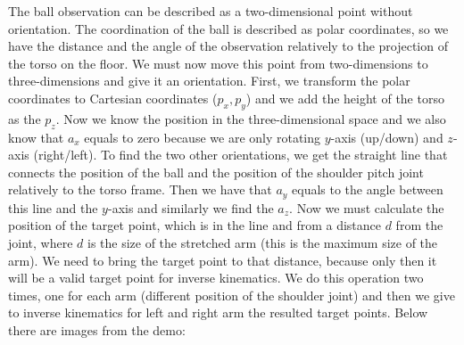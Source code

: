 The ball observation can be described as a two-dimensional point without orientation. The coordination of the ball is described as polar coordinates, so we have the distance and the angle of the observation relatively to the projection of the torso on the floor. We must now move this point from two-dimensions to three-dimensions and give it an orientation. First, we transform the polar coordinates to Cartesian coordinates ($ p_x,p_y $) and we add the height of the torso as the $p_z$. Now we know the position in the three-dimensional space and we also know that $a_x$ equals to zero because we are only rotating $y$-axis (up/down) and $z$-axis (right/left). To find the two other orientations, we get the straight line that connects the position of the ball and the position of the shoulder pitch joint relatively to the torso frame. Then we have that $a_y$ equals to the angle between this line and the $y$-axis and similarly we find the $a_z$. Now we must calculate the position of the target point, which is in the line and from a distance $d$ from the joint, where $d$ is the size of the stretched arm (this is the maximum size of the arm). We need to bring the target point to that distance, because only then it will be a valid target point for inverse kinematics. We do this operation two times, one for each arm (different position of the shoulder joint) and then we give to inverse kinematics for left and right arm the resulted target points. Below there are images from the demo:
